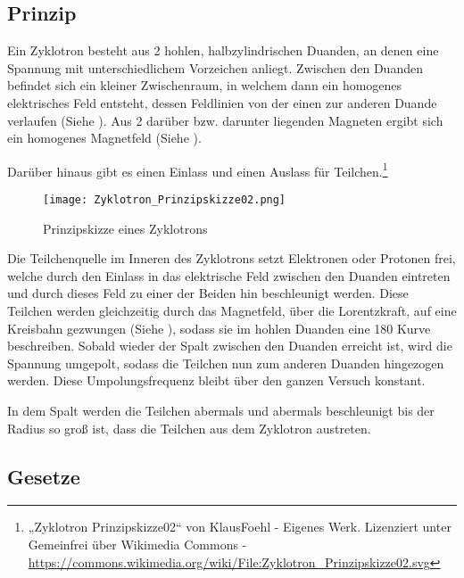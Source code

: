 \subsection{Prinzip} 

Ein Zyklotron besteht aus 2 hohlen, halbzylindrischen Duanden, an denen eine Spannung mit unterschiedlichem Vorzeichen anliegt. Zwischen den Duanden befindet sich ein kleiner Zwischenraum, in welchem dann ein homogenes elektrisches Feld entsteht, dessen Feldlinien von der einen zur anderen Duande verlaufen (Siehe ). Aus 2 darüber bzw. darunter liegenden Magneten ergibt sich ein homogenes Magnetfeld (Siehe ).

Darüber hinaus gibt es einen Einlass und einen Auslass für Teilchen.\footnote{„Zyklotron Prinzipskizze02“ von KlausFoehl - Eigenes Werk. Lizenziert unter Gemeinfrei über Wikimedia Commons - \url{https://commons.wikimedia.org/wiki/File:Zyklotron_Prinzipskizze02.svg}}


\begin{wrapfigure}{o}{0.4\textwidth} \label{Zyklo}

	\vspace{-10pt}
	\texttt{[image: Zyklotron\_Prinzipskizze02.png]}
	\vspace{-13pt}
	\caption{Prinzipskizze eines Zyklotrons}
	\vspace{-5pt}	
	
\end{wrapfigure}

Die Teilchenquelle im Inneren des Zyklotrons setzt Elektronen oder Protonen frei, welche durch den Einlass in das elektrische Feld zwischen den Duanden eintreten und durch dieses Feld zu einer der Beiden hin beschleunigt werden. Diese Teilchen werden gleichzeitig durch das Magnetfeld, über die Lorentzkraft, auf eine Kreisbahn gezwungen (Siehe ), sodass sie im hohlen Duanden eine 180\degree{} Kurve beschreiben. Sobald wieder der Spalt zwischen den Duanden erreicht ist, wird die Spannung umgepolt, sodass die Teilchen nun zum anderen Duanden hingezogen werden. Diese Umpolungsfrequenz bleibt über den ganzen Versuch konstant.

In dem Spalt werden die Teilchen abermals und abermals beschleunigt bis der Radius so groß ist, dass die Teilchen aus dem Zyklotron austreten.


\subsection{Gesetze}

